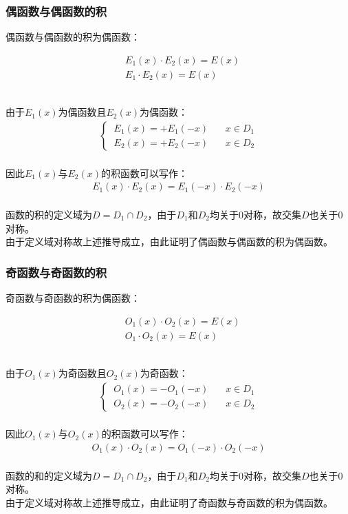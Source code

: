 \documentclass[UTF8]{ctexart}
\begin{document}
\newpage

\subsubsection{偶函数与偶函数的积}
    \setcounter{equation}{0}
    偶函数与偶函数的积为偶函数：
    \begin{large}
        \begin{align*}
            &E_1(x)\cdot E_2(x)=E(x)\\[3mm]
            &E_1\cdot E_2(x)=E(x)
        \end{align*}
    \end{large}\\
    由于$E_1(x)$为偶函数且$E_2(x)$为偶函数：
    \begin{align}
        \begin{cases}
            ~E_1(x)=+E_1(-x)~~~~~~~~x\in D_1\\[1mm]
            ~E_2(x)=+E_2(-x)~~~~~~~~x\in D_2
        \end{cases}
    \end{align}\\
    因此$E_1(x)$与$E_2(x)$的积函数可以写作：
    \begin{align}
        E_1(x)\cdot E_2(x)=E_1(-x)\cdot E_2(-x)
    \end{align}\\
    函数的积的定义域为$D=D_1\cap D_2$，由于$D_1$和$D_2$均关于$0$对称，故交集$D$也关于$0$对称。\\[3mm]
    由于定义域对称故上述推导成立，由此证明了偶函数与偶函数的积为偶函数。\vspace{8pt}

\subsubsection{奇函数与奇函数的积}
    \setcounter{equation}{0}
    奇函数与奇函数的积为偶函数：
    \begin{large}
        \begin{align*}
            &O_1(x)\cdot O_2(x)=E(x)\\[3mm]
            &O_1\cdot O_2(x)=E(x)
        \end{align*}
    \end{large}\\
    由于$O_1(x)$为奇函数且$O_2(x)$为奇函数：
    \begin{align}
        \begin{cases}
            ~O_1(x)=-O_1(-x)~~~~~~~~x\in D_1\\[1mm]
            ~O_2(x)=-O_2(-x)~~~~~~~~x\in D_2
        \end{cases}
    \end{align}\\
    因此$O_1(x)$与$O_2(x)$的积函数可以写作：
    \begin{align}
        O_1(x)\cdot O_2(x)=O_1(-x)\cdot O_2(-x)
    \end{align}\\
    函数的和的定义域为$D=D_1\cap D_2$，由于$D_1$和$D_2$均关于$0$对称，故交集$D$也关于$0$对称。\\[3mm]
    由于定义域对称故上述推导成立，由此证明了奇函数与奇函数的积为偶函数。
\end{document}
